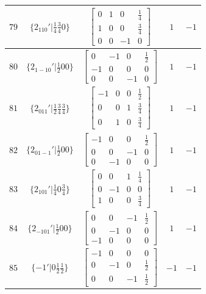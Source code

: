 \documentclass[fleqn,8pt]{jsarticle}
\begin{document}
\begin{longtable}{ccccc}
$ 79 $ & $ \{2{}_{110}{}'|\frac{1}{4} \frac{3}{4} 0\} $ & $ \begin{bmatrix} 0 & 1 & 0 & \frac{1}{4} \\ 1 & 0 & 0 & \frac{3}{4} \\ 0 & 0 & -1 & 0 \end{bmatrix} $ & $ 1 $ & $ -1 $ \\ \hline
$ 80 $ & $ \{2{}_{1-10}{}'|\frac{1}{2} 0 0\} $ & $ \begin{bmatrix} 0 & -1 & 0 & \frac{1}{2} \\ -1 & 0 & 0 & 0 \\ 0 & 0 & -1 & 0 \end{bmatrix} $ & $ 1 $ & $ -1 $ \\ \hline
$ 81 $ & $ \{2{}_{011}{}'|\frac{1}{2} \frac{3}{4} \frac{3}{4}\} $ & $ \begin{bmatrix} -1 & 0 & 0 & \frac{1}{2} \\ 0 & 0 & 1 & \frac{3}{4} \\ 0 & 1 & 0 & \frac{3}{4} \end{bmatrix} $ & $ 1 $ & $ -1 $ \\ \hline
$ 82 $ & $ \{2{}_{01-1}{}'|\frac{1}{2} 0 0\} $ & $ \begin{bmatrix} -1 & 0 & 0 & \frac{1}{2} \\ 0 & 0 & -1 & 0 \\ 0 & -1 & 0 & 0 \end{bmatrix} $ & $ 1 $ & $ -1 $ \\ \hline
$ 83 $ & $ \{2{}_{101}{}'|\frac{1}{4} 0 \frac{3}{4}\} $ & $ \begin{bmatrix} 0 & 0 & 1 & \frac{1}{4} \\ 0 & -1 & 0 & 0 \\ 1 & 0 & 0 & \frac{3}{4} \end{bmatrix} $ & $ 1 $ & $ -1 $ \\ \hline
$ 84 $ & $ \{2{}_{-101}{}'|\frac{1}{2} 0 0\} $ & $ \begin{bmatrix} 0 & 0 & -1 & \frac{1}{2} \\ 0 & -1 & 0 & 0 \\ -1 & 0 & 0 & 0 \end{bmatrix} $ & $ 1 $ & $ -1 $ \\ \hline
$ 85 $ & $ \{-1{}'|0 \frac{1}{2} \frac{1}{2}\} $ & $ \begin{bmatrix} -1 & 0 & 0 & 0 \\ 0 & -1 & 0 & \frac{1}{2} \\ 0 & 0 & -1 & \frac{1}{2} \end{bmatrix} $ & $ -1 $ & $ -1 $ \\ \hline

\end{longtable}
\end{document}
